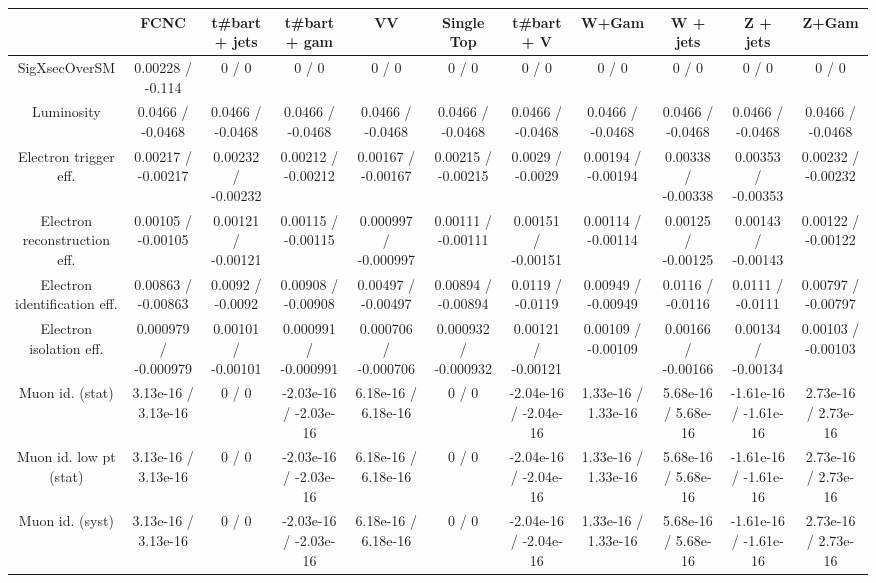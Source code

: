 \begin{table}[htbp]
\begin{center}
\footnotesize
\begin{tabular}{|c|c|c|c|c|c|c|c|c|c|c|}
\hline 
      & FCNC      & t#bar{t} + jets      & t#bar{t} +  gam      & VV      & Single Top      & t#bar{t} + V      & W+Gam      & W + jets      & Z + jets      & Z+Gam \\ 
\hline 
 SigXsecOverSM & 0.00228 / -0.114 & 0 / 0 & 0 / 0 & 0 / 0 & 0 / 0 & 0 / 0 & 0 / 0 & 0 / 0 & 0 / 0 & 0 / 0 \\ 
  Luminosity & 0.0466 / -0.0468 & 0.0466 / -0.0468 & 0.0466 / -0.0468 & 0.0466 / -0.0468 & 0.0466 / -0.0468 & 0.0466 / -0.0468 & 0.0466 / -0.0468 & 0.0466 / -0.0468 & 0.0466 / -0.0468 & 0.0466 / -0.0468 \\ 
  Electron trigger eff. & 0.00217 / -0.00217 & 0.00232 / -0.00232 & 0.00212 / -0.00212 & 0.00167 / -0.00167 & 0.00215 / -0.00215 & 0.0029 / -0.0029 & 0.00194 / -0.00194 & 0.00338 / -0.00338 & 0.00353 / -0.00353 & 0.00232 / -0.00232 \\ 
  Electron reconstruction eff. & 0.00105 / -0.00105 & 0.00121 / -0.00121 & 0.00115 / -0.00115 & 0.000997 / -0.000997 & 0.00111 / -0.00111 & 0.00151 / -0.00151 & 0.00114 / -0.00114 & 0.00125 / -0.00125 & 0.00143 / -0.00143 & 0.00122 / -0.00122 \\ 
  Electron identification eff. & 0.00863 / -0.00863 & 0.0092 / -0.0092 & 0.00908 / -0.00908 & 0.00497 / -0.00497 & 0.00894 / -0.00894 & 0.0119 / -0.0119 & 0.00949 / -0.00949 & 0.0116 / -0.0116 & 0.0111 / -0.0111 & 0.00797 / -0.00797 \\ 
  Electron isolation eff. & 0.000979 / -0.000979 & 0.00101 / -0.00101 & 0.000991 / -0.000991 & 0.000706 / -0.000706 & 0.000932 / -0.000932 & 0.00121 / -0.00121 & 0.00109 / -0.00109 & 0.00166 / -0.00166 & 0.00134 / -0.00134 & 0.00103 / -0.00103 \\ 
  Muon id. (stat) & 3.13e-16 / 3.13e-16 & 0 / 0 & -2.03e-16 / -2.03e-16 & 6.18e-16 / 6.18e-16 & 0 / 0 & -2.04e-16 / -2.04e-16 & 1.33e-16 / 1.33e-16 & 5.68e-16 / 5.68e-16 & -1.61e-16 / -1.61e-16 & 2.73e-16 / 2.73e-16 \\ 
  Muon id. low pt (stat) & 3.13e-16 / 3.13e-16 & 0 / 0 & -2.03e-16 / -2.03e-16 & 6.18e-16 / 6.18e-16 & 0 / 0 & -2.04e-16 / -2.04e-16 & 1.33e-16 / 1.33e-16 & 5.68e-16 / 5.68e-16 & -1.61e-16 / -1.61e-16 & 2.73e-16 / 2.73e-16 \\ 
  Muon id. (syst) & 3.13e-16 / 3.13e-16 & 0 / 0 & -2.03e-16 / -2.03e-16 & 6.18e-16 / 6.18e-16 & 0 / 0 & -2.04e-16 / -2.04e-16 & 1.33e-16 / 1.33e-16 & 5.68e-16 / 5.68e-16 & -1.61e-16 / -1.61e-16 & 2.73e-16 / 2.73e-16 \\ 

\end{tabular}
\end{center}
\end{table}
